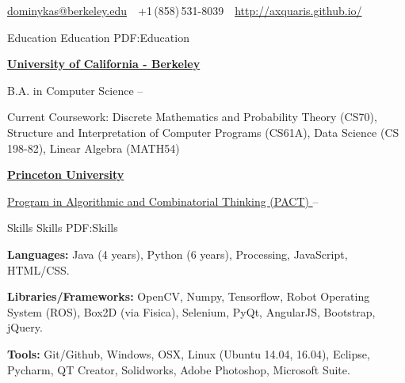 \documentclass[letterpaper,MMMyyyy,nonstopmode]{simpleresumecv}
\newcommand{\CVAuthor}{Domas Buracas}
\newcommand{\CVWebpage}{http://axquaris.github.io/}
\begin{document}

\Title{\CVAuthor}

\begin{SubTitle}
\par
\href{mailto:dominykas@berkeley.edu}
{dominykas@berkeley.edu}
\,\SubBulletSymbol\,
+1\,(858)\,531-8039
\,\SubBulletSymbol\,
\href{\CVWebpage}
{\url{\CVWebpage}}
\end{SubTitle}

\begin{Body}


\Section
{Education}
{Education}
{PDF:Education}

\Entry
\href{http://www.berkeley.edu/}
{\textbf{University of California - Berkeley}}

\Gap
\BulletItem
B.A. in Computer Science
\hfill
{} --
\begin{Detail}
\SubBulletItem
Current Coursework: Discrete Mathematics and Probability Theory (CS70),
Structure and Interpretation of Computer Programs (CS61A),
Data Science (CS 198-82), Linear Algebra (MATH54)
\end{Detail}

\BigGap
\Entry
\href{https://www.princeton.edu/}
{\textbf{Princeton University}}

\Gap
\BulletItem
\href{https://algorithmicthinking.org/}
{Program in Algorithmic and Combinatorial Thinking (PACT) }
\hfill
{} --


\Section
{Skills}
{Skills}
{PDF:Skills}

\Entry
\textbf{Languages:}
Java (4 years),
Python (6 years),
Processing,
JavaScript,
HTML/CSS.

\Entry
\textbf{Libraries/Frameworks:}
OpenCV,
Numpy,
Tensorflow,
Robot Operating System (ROS),
Box2D (via Fisica),
Selenium,
PyQt,
AngularJS,
Bootstrap,
jQuery.

\Entry
\textbf{Tools:}
Git/Github,
Windows,
OSX,
Linux (Ubuntu 14.04, 16.04),
Eclipse,
Pycharm,
QT Creator,
Solidworks,
Adobe Photoshop,
Microsoft Suite.



\end{Body}
\end{document}
